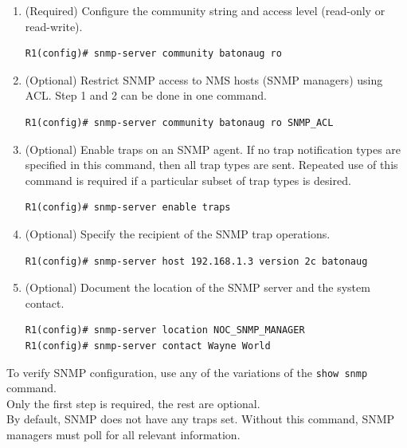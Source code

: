 \begin{enumerate}
\item (Required) Configure the community string and access level (read-only or read-write).

\begin{verbatim}
R1(config)# snmp-server community batonaug ro
\end{verbatim}

\item (Optional) Restrict SNMP access to NMS hosts (SNMP managers) using ACL. Step 1 and 2 can be done in one command.

\begin{verbatim}
R1(config)# snmp-server community batonaug ro SNMP_ACL
\end{verbatim}

\item (Optional) Enable traps on an SNMP agent. If no trap notification types are specified in this command, then all trap types are sent. Repeated use of this command is required if a particular subset of trap types is desired.

\begin{verbatim}
R1(config)# snmp-server enable traps
\end{verbatim}

\item (Optional) Specify the recipient of the SNMP trap operations.

\begin{verbatim}
R1(config)# snmp-server host 192.168.1.3 version 2c batonaug
\end{verbatim}

\item (Optional) Document the location of the SNMP server and the system contact.

\begin{verbatim}
R1(config)# snmp-server location NOC_SNMP_MANAGER
R1(config)# snmp-server contact Wayne World
\end{verbatim}

\end{enumerate}

\note To verify SNMP configuration, use any of the variations of the \texttt{show snmp} command.\\ 
\note Only the first step is required, the rest are optional.\\
\note By default, SNMP does not have any traps set. Without this command, SNMP managers must poll for all relevant information. 

